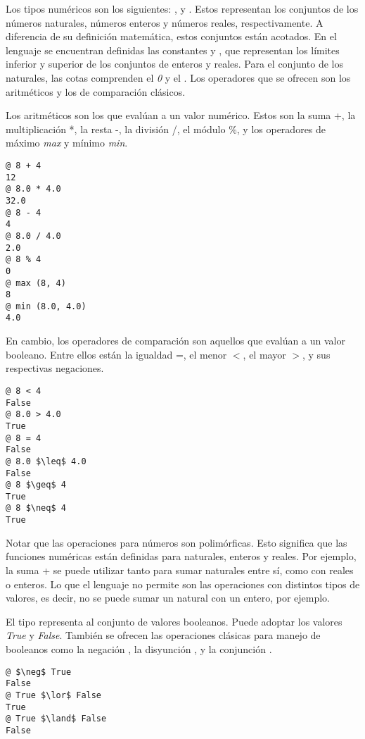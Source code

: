 \documentclass{article}
\begin{document}
Los tipos numéricos son los siguientes: ,  y .
Estos representan los conjuntos de los números naturales, números enteros y números reales, respectivamente.
A diferencia de su definición matemática, estos conjuntos están acotados.
En el lenguaje se encuentran definidas las constantes \ninf\space y \pinf, que representan los límites inferior y superior de los conjuntos de enteros y reales.
Para el conjunto de los naturales, las cotas comprenden el \textit{0} y el \pinf.
Los operadores que se ofrecen son los aritméticos y los de comparación clásicos.

Los aritméticos son los que evalúan a un valor numérico.
Estos son la suma +, la multiplicación *, la resta -, la división /, el módulo \%, y los operadores de máximo \textit{max} y mínimo \textit{min}.

\begin{lstlisting}
@ 8 + 4
12
@ 8.0 * 4.0
32.0
@ 8 - 4
4
@ 8.0 / 4.0
2.0
@ 8 % 4
0
@ max (8, 4)
8
@ min (8.0, 4.0)
4.0
\end{lstlisting}

En cambio, los operadores de comparación son aquellos que evalúan a un valor booleano.
Entre ellos están la igualdad =, el menor $<$, el mayor $>$, y sus respectivas negaciones.

\begin{lstlisting}
@ 8 < 4
False
@ 8.0 > 4.0
True
@ 8 = 4
False
@ 8.0 $\leq$ 4.0
False
@ 8 $\geq$ 4
True
@ 8 $\neq$ 4
True
\end{lstlisting}

Notar que las operaciones para números son polimórficas.
Esto significa que las funciones numéricas están definidas para naturales, enteros y reales.
Por ejemplo, la suma + se puede utilizar tanto para sumar naturales entre sí, como con reales o enteros.
Lo que el lenguaje no permite son las operaciones con distintos tipos de valores, es decir, no se puede sumar un natural con un entero, por ejemplo.

El tipo  representa al conjunto de valores booleanos.
Puede adoptar los valores \textit{True} y \textit{False}.
También se ofrecen las operaciones clásicas para manejo de booleanos como la negación \snot, la disyunción \sor, y la conjunción \sand.

\begin{lstlisting}
@ $\neg$ True
False
@ True $\lor$ False
True
@ True $\land$ False
False
\end{lstlisting}
\end{document}
